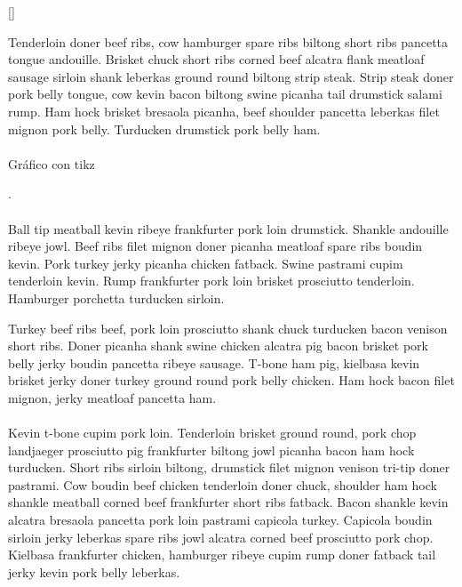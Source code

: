 []

Tenderloin doner beef ribs, cow hamburger spare ribs biltong short ribs pancetta tongue andouille. Brisket chuck short ribs corned beef alcatra flank meatloaf sausage sirloin shank leberkas ground round biltong strip steak. Strip steak doner pork belly tongue, cow kevin bacon biltong swine picanha tail drumstick salami rump. Ham hock brisket bresaola picanha, beef shoulder pancetta leberkas filet mignon pork belly. Turducken drumstick pork belly ham.

\paragraph{}
Gráfico con tikz
.

\paragraph{}
Ball tip meatball kevin ribeye frankfurter pork loin drumstick. Shankle andouille ribeye jowl. Beef ribs filet mignon doner picanha meatloaf spare ribs boudin kevin. Pork turkey jerky picanha chicken fatback. Swine pastrami cupim tenderloin kevin. Rump frankfurter pork loin brisket prosciutto tenderloin. Hamburger porchetta turducken sirloin.

Turkey beef ribs beef, pork loin prosciutto shank chuck turducken bacon venison short ribs. Doner picanha shank swine chicken alcatra pig bacon brisket pork belly jerky boudin pancetta ribeye sausage. T-bone ham pig, kielbasa kevin brisket jerky doner turkey ground round pork belly chicken. Ham hock bacon filet mignon, jerky meatloaf pancetta ham.

\paragraph{}
Kevin t-bone cupim pork loin. Tenderloin brisket ground round, pork chop landjaeger prosciutto pig frankfurter biltong jowl picanha bacon ham hock turducken. Short ribs sirloin biltong, drumstick filet mignon venison tri-tip doner pastrami. Cow boudin beef chicken tenderloin doner chuck, shoulder ham hock shankle meatball corned beef frankfurter short ribs fatback. Bacon shankle kevin alcatra bresaola pancetta pork loin pastrami capicola turkey. Capicola boudin sirloin jerky leberkas spare ribs jowl alcatra corned beef prosciutto pork chop. Kielbasa frankfurter chicken, hamburger ribeye cupim rump doner fatback tail jerky kevin pork belly leberkas.

